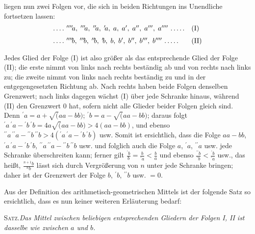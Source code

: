 liegen nun zwei Folgen vor, die sich in beiden Richtungen ins Unendliche fortsetzen lassen:
\[
\begin{array}{@{}ll@{}}
.\,.\,.\,.\ {}^{\prime\prime\prime\prime}\!a,\;{}^{\prime\prime\prime}\!a,\;{}^{\prime\prime}\!a,\;{}^{\prime}\!a,\; a,\; a',\; a'',\; a''',\; a''''\ .\,.\,.\,.\,.&\mathrm{(I)}\\[6pt]
.\,.\,.\,.\ {}^{\prime\prime\prime\prime}\!b,\;{}^{\prime\prime\prime}\!b,\;{}^{\prime\prime}\!b,\;{}^{\prime}\!b,\; b,\; b',\; b'',\; b''',\; b''''\ .\,.\,.\,.\,.&\mathrm{(II)}
\end{array}
\]
\par Jedes Glied der Folge (I) ist also größer als das entsprechende Glied der Folge (II); die erste nimmt von links nach rechts beständig ab und von rechts nach links
zu; die zweite nimmt von links nach rechts beständig zu und in der entgegengesetzten Richtung ab.
Nach rechts haben beide Folgen denselben Grenzwert; nach links dagegen wächst (I)
über jede Schranke hinaus, während (II) den Grenzwert $0$ hat, sofern nicht alle Glieder beider Folgen gleich sind. Denn ${}^{\prime}\!a=a+\surd(aa-bb)$; ${}^{\prime}\!b=a-\surd(aa-bb)$;
daraus folgt ${}^{\prime}\!a\,{}^{\prime}\!a-{}^{\prime}\!b\,{}^{\prime}\!b=4a\surd(aa-bb)>4(aa-bb)$, und ebenso ${}^{\prime\prime}\!a\,\allowbreak {}^{\prime\prime}\!a-{}^{\prime\prime}\!b\,\allowbreak {}^{\prime\prime}\!b>4({}^{\prime}\!a\,\allowbreak {}^{\prime}\!a-{}^{\prime}\!b\,\allowbreak {}^{\prime}\!b)$
usw. Somit ist ersichtlich, dass die Folge $aa-bb$, ${}^{\prime}\!a\,{}^{\prime}\!a-{}^{\prime}\!b\,{}^{\prime}\!b$, ${}^{\prime\prime}\!a\,{}^{\prime\prime}\!a-{}^{\prime\prime}\!b\,{}^{\prime\prime}\!b$ usw. und folglich auch die Folge
$a$, ${}^{\prime}\!a$, ${}^{\prime\prime}\!a$ usw. jede Schranke überschreiten kann; ferner gilt $\frac{{}^{\prime}\!b}{b}=\frac{b}{{}^{\prime}\!a}<\frac{b}{a}$ und ebenso $\frac{{}^{\prime\prime}\!b}{{}^{\prime}\!b}<\frac{{}^{\prime}\!b}{{}^{\prime}\!a}$ usw.,
das heißt, $\frac{{}^{n+1}\!b}{{}^{n}\!b}$ lässt sich durch Vergrößerung von $n$ unter jede Schranke bringen; daher ist der Grenzwert
der Folge $b$, ${}^{\prime}\!b$, ${}^{\prime\prime}\!b$ usw.\nobreak{} $=0$.
\par 
Aus der Definition des arithmetisch-geometrischen Mittels ist der folgende Satz so ersichtlich,
dass es nun keiner weiteren Erläuterung bedarf:

\textsc{Satz.}\quad \textit{Das Mittel zwischen beliebigen entsprechenden Gliedern der Folgen I, II ist dasselbe wie zwischen $a$ und $b$.}

\clearpage
\endgroup
